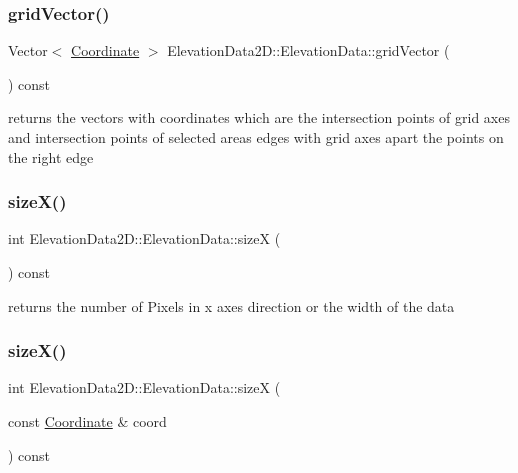 \subsubsection{\texorpdfstring{grid\+Vector()}{gridVector()}}
{\footnotesize\ttfamily Vector$<$ \mbox{\hyperlink{classElevationData2D_1_1Coordinate}{Coordinate}} $>$ Elevation\+Data2\+D\+::\+Elevation\+Data\+::grid\+Vector (\begin{DoxyParamCaption}{ }\end{DoxyParamCaption}) const}

returns the vectors with coordinates which are the intersection points of grid axes and intersection points of selected area\textquotesingle{}s edges with grid axes apart the points on the right edge \mbox{\label{classElevationData2D_1_1ElevationData_a058ce71c9949c9bb0ce9a933a60dcc4d}} 
\subsubsection{\texorpdfstring{size\+X()}{sizeX()}\hspace{0.1cm}{\footnotesize\ttfamily [1/2]}}
{\footnotesize\ttfamily int Elevation\+Data2\+D\+::\+Elevation\+Data\+::sizeX (\begin{DoxyParamCaption}{ }\end{DoxyParamCaption}) const}

returns the number of Pixels in x axes direction or the width of the data \mbox{\label{classElevationData2D_1_1ElevationData_a171ff10d701d61b375a8d9a4e49d696e}} 
\subsubsection{\texorpdfstring{size\+X()}{sizeX()}\hspace{0.1cm}{\footnotesize\ttfamily [2/2]}}
{\footnotesize\ttfamily int Elevation\+Data2\+D\+::\+Elevation\+Data\+::sizeX (\begin{DoxyParamCaption}\item[{const \mbox{\hyperlink{classElevationData2D_1_1Coordinate}{Coordinate}} \&}]{coord }\end{DoxyParamCaption}) const}

